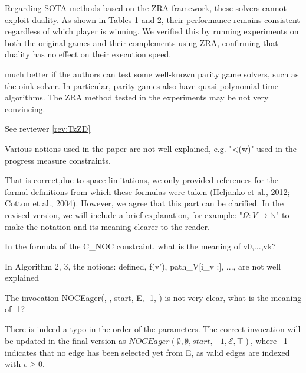 \documentclass{article}
\begin{document}
Regarding SOTA methods based on the ZRA framework, these solvers cannot exploit duality. As shown in Tables 1 and 2, their performance remains consistent regardless of which player is winning. We verified this by running experiments on both the original games and their complements using ZRA, confirming that duality has no effect on their execution speed.

\begin{reviewer}
much better if the authors can test some well-known parity game solvers, such as the oink solver. In particular, parity games also have quasi-polynomial time algorithms. The ZRA method tested in the experiments may be not very convincing.
\end{reviewer} 

See reviewer \ref{rev:TzZD}
 
\begin{reviewer}
Various notions used in the paper are not well explained, e.g. "<\Omega(w)" used in the progress measure constraints.
\end{reviewer}

That is correct,due to space limitations, we only provided references for the formal definitions from which these formulas were taken (Heljanko et al., 2012; Cotton et al., 2004). However, we agree that this part can be clarified. In the revised version, we will include a brief explanation, for example: "$\Omega : V \rightarrow \mathbb{N}$" to make the notation and its meaning clearer to the reader.

\begin{reviewer}
In the formula of the C_{NOC} constraint, what is the meaning of v0,...,vk? 
\end{reviewer}

\begin{reviewer}
In Algorithm 2, 3, the notions: defined, f(v'), path_V[i_v :], ..., are not well explained
\end{reviewer}

\begin{reviewer}
The invocation NOCEager(\emptyset, \emptyset, start, E, -1, \top) is not very clear, what is the meaning of -1?
\end{reviewer}

There is indeed a typo in the order of the parameters. The correct invocation will be updated in the final version as $NOCEager(\emptyset, \emptyset, start, -1, \mathcal{E}, \top)$, where –1 indicates that no edge has been selected yet from E, as valid edges are indexed with $e \ge 0$.
\end{document}
